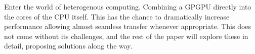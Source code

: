 Enter the world of heterogenous computing. Combining a GPGPU directly into the cores of the CPU itself. This has the chance to dramatically increase performance allowing almost seamless transfer whenever appropriate. This does not come without its challenges, and the rest of the paper will explore these in detail, proposing solutions along the way. 












